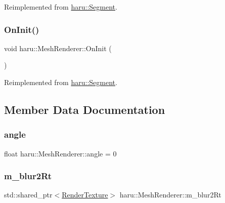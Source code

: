 Reimplemented from \mbox{\hyperlink{classharu_1_1_segment_a5bb0f5cf9aecda465804016d3ed4092c}{haru\+::\+Segment}}.

\mbox{\label{classharu_1_1_mesh_renderer_a5a6a5b945fc7560d166e9d16058aec53}} 
\subsubsection{\texorpdfstring{On\+Init()}{OnInit()}}
{\footnotesize\ttfamily void haru\+::\+Mesh\+Renderer\+::\+On\+Init (\begin{DoxyParamCaption}{ }\end{DoxyParamCaption})\hspace{0.3cm}{\ttfamily [virtual]}}



Reimplemented from \mbox{\hyperlink{classharu_1_1_segment_adc41c8e5769e0057ade94abf669c6dbc}{haru\+::\+Segment}}.



\subsection{Member Data Documentation}
\mbox{\label{classharu_1_1_mesh_renderer_ad1881dc8b63b1824fadc85436624241c}} 
\subsubsection{\texorpdfstring{angle}{angle}}
{\footnotesize\ttfamily float haru\+::\+Mesh\+Renderer\+::angle = 0}

\mbox{\label{classharu_1_1_mesh_renderer_a7e980792681d9b28915b27f46dfa99ac}} 
\subsubsection{\texorpdfstring{m\+\_\+blur2\+Rt}{m\_blur2Rt}}
{\footnotesize\ttfamily std\+::shared\+\_\+ptr$<$\mbox{\hyperlink{classharu_1_1_render_texture}{Render\+Texture}}$>$ haru\+::\+Mesh\+Renderer\+::m\+\_\+blur2\+Rt\hspace{0.3cm}{\ttfamily [private]}}

